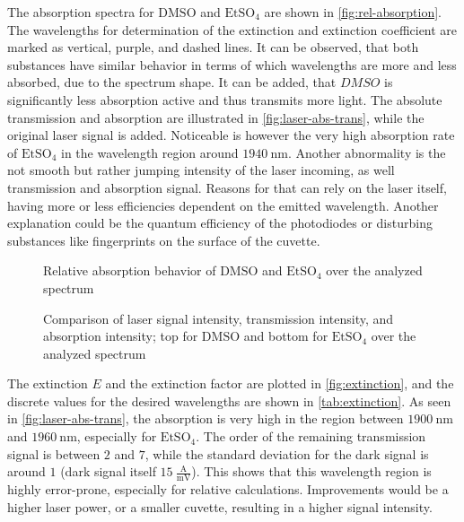 The absorption spectra for $\mathrm{DMSO}$ and $\mathrm{EtSO_4}$ are shown in \autoref{fig:rel-absorption}. The wavelengths for determination of the extinction and extinction coefficient are marked as vertical, purple, and dashed lines. It can be observed, that both substances have similar behavior in terms of which wavelengths are more and less absorbed, due to the spectrum shape. It can be added, that $DMSO$ is significantly less absorption active and thus transmits more light. The absolute transmission and absorption are illustrated in \autoref{fig:laser-abs-trans}, while the original laser signal is added. Noticeable is however the very high absorption rate of $\mathrm{EtSO_4}$ in the wavelength region around $1940~\mathrm{nm}$. Another abnormality is the not smooth but rather jumping intensity of the laser incoming, as well transmission and absorption signal. Reasons for that can rely on the laser itself, having more or less efficiencies dependent on the emitted wavelength. Another explanation could be the quantum efficiency of the photodiodes or disturbing substances like fingerprints on the surface of the cuvette.

\begin{figure}[H]
    \centering
    
    \caption[Relative absorption spectra]{Relative absorption behavior of $\mathrm{DMSO}$ and $\mathrm{EtSO_4}$ over the analyzed spectrum}
    \label{fig:rel-absorption}
\end{figure}

\begin{figure}
    \centering
    \begin{turn}{90}
        
    \end{turn}
    \caption[Comparison of origin, transmitted and absorbed signals]{Comparison of laser signal intensity, transmission intensity, and absorption intensity; top for $\mathrm{DMSO}$ and bottom for $\mathrm{EtSO_4}$ over the analyzed spectrum}
    \label{fig:laser-abs-trans}
\end{figure}

The extinction $E$ and the extinction factor are plotted in \autoref{fig:extinction}, and the discrete values for the desired wavelengths are shown in \autoref{tab:extinction}. As seen in \autoref{fig:laser-abs-trans}, the absorption is very high in the region between $1900~\mathrm{nm}$ and $1960~\mathrm{nm}$, especially for $\mathrm{EtSO_4}$. The order of the remaining transmission signal is between $2$ and $7$, while the standard deviation for the dark signal is around $1$ (dark signal itself $15~\mathrm{\frac{A}{mV}}$). This shows that this wavelength region is highly error-prone, especially for relative calculations. Improvements would be a higher laser power, or a smaller cuvette, resulting in a higher signal intensity.

